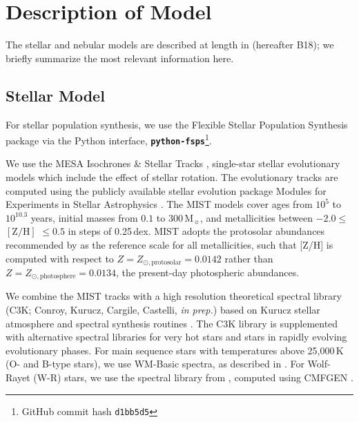 \documentclass[preprint2]{aastex62}
\newcommand{\FSPS}{{\sc FSPS}\xspace}
\newcommand{\pFSPS}{{\tt \textbf{python-fsps}}\xspace}
\newcommand\Msun{\ensuremath{\mathrm{M_{\sun}}}\xspace}
\begin{document}
\section{Description of Model} \label{sec:model}

The stellar and nebular models are described at length in \citet{Byler+2018} (hereafter B18); we briefly summarize the most relevant information here.

\subsection{Stellar Model} \label{sec:model:stars}

For stellar population synthesis, we use the Flexible Stellar Population Synthesis package \citep[\FSPS;][]{Conroy+2009, Conroy+2010} via the Python interface, \pFSPS \citep{pythonFSPSdfm}\footnote{GitHub commit hash \texttt{d1bb5d5}}.

We use the MESA Isochrones \& Stellar Tracks \citep[MIST;][]{Dotter+2016, Choi+2016}, single-star stellar evolutionary models which include the effect of stellar rotation. The evolutionary tracks are computed using the publicly available stellar evolution package Modules for Experiments in Stellar Astrophysics \citep[MESA v7503;][]{Paxton+2011,Paxton+2013, Paxton+2015}. The MIST models cover ages from $10^5$ to $10^{10.3}$ years, initial masses from $0.1$ to $300\,$\Msun, and metallicities between $-2.0 \leq$ $[\mathrm{Z}/\mathrm{H}]$ $\leq 0.5$ in steps of 0.25\,dex. MIST adopts the protosolar abundances recommended by \citet{Asplund+2009} as the reference scale for all metallicities, such that [Z/H] is computed with respect to $Z=Z_{\odot,\mathrm{protosolar}}=0.0142$ rather than $Z=Z_{\odot,\mathrm{photosphere}}=0.0134$, the present-day photospheric abundances.

We combine the MIST tracks with a high resolution theoretical spectral library (C3K; Conroy, Kurucz, Cargile, Castelli, \emph{in prep.}) based on Kurucz stellar atmosphere and spectral synthesis routines \citep[ATLAS12 and SYNTHE,][]{Kurucz+2005}. The C3K library is supplemented with alternative spectral libraries for very hot stars and stars in rapidly evolving evolutionary phases. For main sequence stars with temperatures above 25,000$\,$K (O- and B-type stars), we use WM-Basic \citep{Pauldrach+2001} spectra, as described in \citet{Eldridge+2017}. For Wolf-Rayet (W-R) stars, we use the spectral library from \citet{Smith+2002}, computed using CMFGEN \citep{Hillier+2001}.
\end{document}
